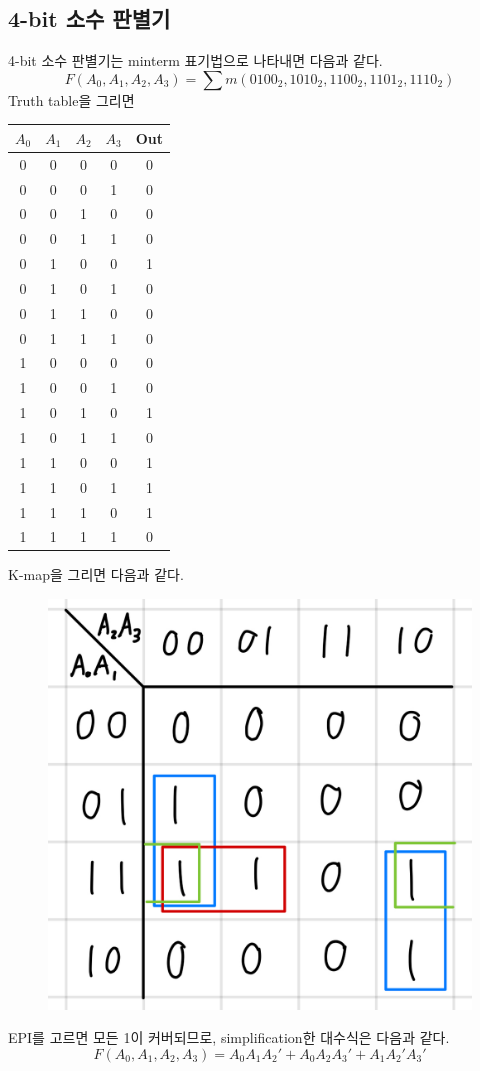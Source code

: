\documentclass{scrartcl}
\begin{document}
\subsection{4-bit 소수 판별기}
4-bit 소수 판별기는 minterm 표기법으로 나타내면 다음과 같다.
\[
  F(A_0, A_1, A_2, A_3) = \sum m(0100_2, 1010_2, 1100_2, 1101_2, 1110_2)
\]
Truth table을 그리면
\begin{table}[H]
  \centering
  \begin{tabular}{|cccc|c|}
    \hline
    \(A_0\) & \(A_1\) & \(A_2\) & \(A_3\) & Out \\
    \hline
    0       & 0       & 0       & 0       & 0   \\
    0       & 0       & 0       & 1       & 0   \\
    0       & 0       & 1       & 0       & 0   \\
    0       & 0       & 1       & 1       & 0   \\
    0       & 1       & 0       & 0       & 1   \\
    0       & 1       & 0       & 1       & 0   \\
    0       & 1       & 1       & 0       & 0   \\
    0       & 1       & 1       & 1       & 0   \\
    1       & 0       & 0       & 0       & 0   \\
    1       & 0       & 0       & 1       & 0   \\
    1       & 0       & 1       & 0       & 1   \\
    1       & 0       & 1       & 1       & 0   \\
    1       & 1       & 0       & 0       & 1   \\
    1       & 1       & 0       & 1       & 1   \\
    1       & 1       & 1       & 0       & 1   \\
    1       & 1       & 1       & 1       & 0   \\
    \hline
  \end{tabular}
\end{table}
K-map을 그리면 다음과 같다.
\begin{figure}[H]
  \centering
  \includegraphics[width=0.3\linewidth]{lab3_2_km}
\end{figure}
EPI를 고르면 모든 1이 커버되므로, simplification한 대수식은 다음과 같다.
\[
  F(A_0, A_1, A_2, A_3) = A_0 A_1 A_2' + A_0 A_2 A_3' + A_1 A_2' A_3'
\]
\end{document}
